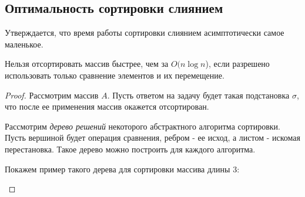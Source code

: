 \documentclass[../main.tex]{subfiles}
\begin{document}
	\subsection{Оптимальность сортировки слиянием}
	
	Утверждается, что время работы сортировки слиянием асимптотически самое маленькое.
	
	\begin{theorem}
		Нельзя отсортировать массив быстрее, чем за $O(n \log n$), если разрешено использовать только сравнение элементов и их перемещение.
	\end{theorem}
	
	
	\begin{proof}
		Рассмотрим массив $A$. Пусть ответом на задачу будет такая подстановка $\sigma$, что после ее применения массив окажется отсортирован.
		
		Рассмотрим \textit{дерево решений} некоторого абстрактного алгоритма сортировки. Пусть вершиной будет операция сравнения, ребром - ее исход, а листом - искомая перестановка. Такое дерево можно построить для каждого алгоритма. 
		
		Покажем пример такого дерева для сортировки массива длины 3:
		\begin{center}
\end{center}
\end{proof}
\end{document}
